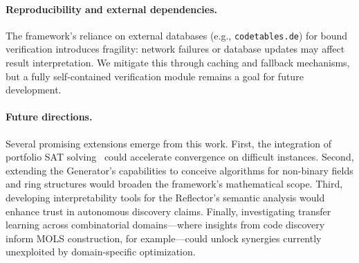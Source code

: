 \paragraph{Reproducibility and external dependencies.} The framework's reliance on external databases (e.g., \texttt{codetables.de}) for bound verification introduces fragility: network failures or database updates may affect result interpretation. We mitigate this through caching and fallback mechanisms, but a fully self-contained verification module remains a goal for future development.

\paragraph{Future directions.} Several promising extensions emerge from this work. First, the integration of portfolio SAT solving~\cite{Zhang2025SolSearch} could accelerate convergence on difficult instances. Second, extending the Generator's capabilities to conceive algorithms for non-binary fields and ring structures would broaden the framework's mathematical scope. Third, developing interpretability tools for the Reflector's semantic analysis would enhance trust in autonomous discovery claims. Finally, investigating transfer learning across combinatorial domains---where insights from code discovery inform MOLS construction, for example---could unlock synergies currently unexploited by domain-specific optimization.
